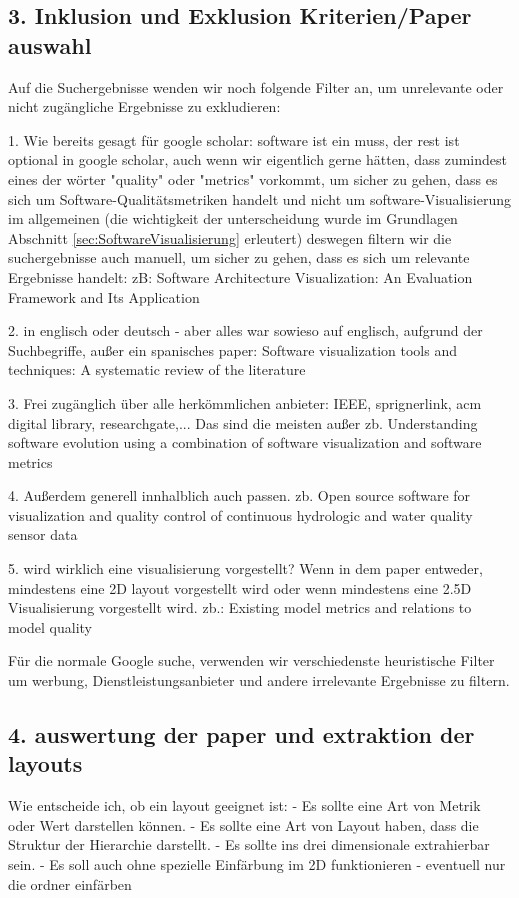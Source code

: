 \subsection*{3. Inklusion und Exklusion Kriterien/Paper auswahl} \label{sec:InklusionExklusionKriterien}
Auf die Suchergebnisse wenden wir noch folgende Filter an, um unrelevante oder nicht zugängliche Ergebnisse zu exkludieren:

1. Wie bereits gesagt für google scholar: software ist ein muss, der rest ist optional in google scholar, auch wenn wir eigentlich gerne hätten, dass zumindest eines der wörter "quality" oder "metrics" vorkommt, um sicher zu gehen, dass es sich um Software-Qualitätsmetriken handelt und nicht um software-Visualisierung im allgemeinen (die wichtigkeit der unterscheidung wurde im Grundlagen Abschnitt \ref{sec:SoftwareVisualisierung} erleutert) deswegen filtern wir die suchergebnisse auch manuell, um sicher zu gehen, dass es sich um relevante Ergebnisse handelt: zB: Software Architecture Visualization: An Evaluation Framework and Its Application \cite{gallagher2008software}

2. in englisch oder deutsch - aber alles war sowieso auf englisch, aufgrund der Suchbegriffe, außer ein spanisches paper: Software visualization tools and techniques: A systematic review of the literature\cite{cruz2016software}

3. Frei zugänglich über alle herkömmlichen anbieter: IEEE, sprignerlink, acm digital library, researchgate,... Das sind die meisten außer zb. Understanding software evolution using a combination of software visualization and software metrics \cite{lanza2002understanding}

4. Außerdem generell innhalblich auch passen. zb. Open source software for visualization and quality control of continuous hydrologic and water quality sensor data \cite{horsburgh2015open}

5. wird wirklich eine visualisierung vorgestellt? Wenn in dem paper entweder, mindestens eine 2D layout vorgestellt wird oder wenn mindestens eine 2.5D Visualisierung vorgestellt wird. zb.: Existing model metrics and relations to model quality \cite{mohagheghi2009existing}

Für die normale Google suche, verwenden wir verschiedenste heuristische Filter um werbung, Dienstleistungsanbieter und andere irrelevante Ergebnisse zu filtern.

\subsection*{4. auswertung der paper und extraktion der layouts} \label{sec:AuswertungPaper}
Wie entscheide ich, ob ein layout geeignet ist:
- Es sollte eine Art von Metrik oder Wert darstellen können.
- Es sollte eine Art von Layout haben, dass die Struktur der Hierarchie darstellt.
- Es sollte ins drei dimensionale extrahierbar sein.
- Es soll auch ohne spezielle Einfärbung im 2D funktionieren - eventuell nur die ordner einfärben

